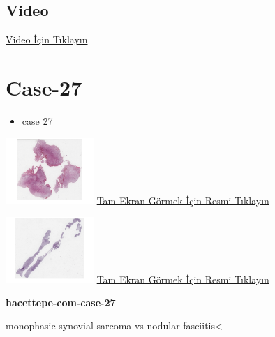 \documentclass[
  letterpaper,
  DIV=11,
  numbers=noendperiod]{scrreprt}
\providecommand{\tightlist}{%
  \setlength{\itemsep}{0pt}\setlength{\parskip}{0pt}}\usepackage{longtable,booktabs,array}
\begin{document}
\hypertarget{video-24}{%
\subsection{Video}\label{video-24}}

\href{https://www.youtube.com/watch?v=UHadS40tpkY}{Video İçin Tıklayın}

\hypertarget{sec-hacettepe-case-of-the-month-case-27}{%
\section{Case-27}\label{sec-hacettepe-case-of-the-month-case-27}}

\begin{itemize}
\tightlist
\item
  \href{https://www.youtube.com/watch?v=c2ePAdTH00g\&ab_channel=KemalKosemehmetoglu}{case
  27}
\end{itemize}

\href{https://images.patolojiatlasi.com/hacettepe-com-case-27/HE1.html}{\includegraphics[width=0.25\textwidth,height=\textheight]{./screenshots/thumbnail_hacettepe-com-case-27-1.png}}
\href{https://images.patolojiatlasi.com/hacettepe-com-case-27/HE1.html}{Tam
Ekran Görmek İçin Resmi Tıklayın}

\href{https://images.patolojiatlasi.com/hacettepe-com-case-27/HE2.html}{\includegraphics[width=0.25\textwidth,height=\textheight]{./screenshots/thumbnail_hacettepe-com-case-27-2.png}}
\href{https://images.patolojiatlasi.com/hacettepe-com-case-27/HE2.html}{Tam
Ekran Görmek İçin Resmi Tıklayın}

\textbf{hacettepe-com-case-27}

\begin{tcolorbox}[enhanced jigsaw, colbacktitle=quarto-callout-tip-color!10!white, colback=white, titlerule=0mm, opacityback=0, colframe=quarto-callout-tip-color-frame, opacitybacktitle=0.6, bottomrule=.15mm, breakable, coltitle=black, title=\textcolor{quarto-callout-tip-color}{\faLightbulb}\hspace{0.5em}{Tanı}, toprule=.15mm, toptitle=1mm, bottomtitle=1mm, arc=.35mm, rightrule=.15mm, leftrule=.75mm, left=2mm]

monophasic synovial sarcoma vs nodular fasciitis\textless{}

\end{tcolorbox}
\end{document}
